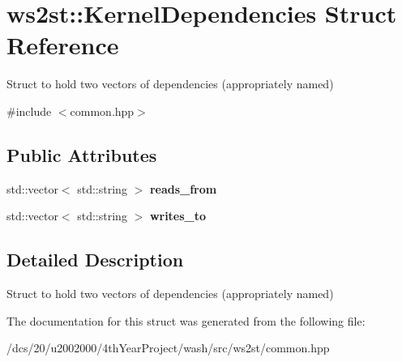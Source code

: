 \hypertarget{structws2st_1_1KernelDependencies}{}\section{ws2st\+:\+:Kernel\+Dependencies Struct Reference}
\label{structws2st_1_1KernelDependencies}


Struct to hold two vectors of dependencies (appropriately named)  




{\ttfamily \#include $<$common.\+hpp$>$}

\subsection*{Public Attributes}
\begin{DoxyCompactItemize}
\item 
\mbox{\label{structws2st_1_1KernelDependencies_a4385ba2e56f0d9b63772480b2c3da15d}} 
std\+::vector$<$ std\+::string $>$ {\bfseries reads\+\_\+from}
\item 
\mbox{\label{structws2st_1_1KernelDependencies_a85a9ccadcb7d6912675a21cf500a4ef1}} 
std\+::vector$<$ std\+::string $>$ {\bfseries writes\+\_\+to}
\end{DoxyCompactItemize}


\subsection{Detailed Description}
Struct to hold two vectors of dependencies (appropriately named) 

The documentation for this struct was generated from the following file\+:\begin{DoxyCompactItemize}
\item 
/dcs/20/u2002000/4th\+Year\+Project/wash/src/ws2st/common.\+hpp\end{DoxyCompactItemize}
